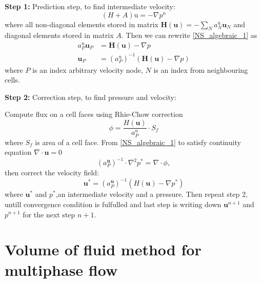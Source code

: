 \textbf{Step 1:} Prediction step, to find intermediate velocity:
\begin{equation}\label{NS_algebraic_1}
    (H+A)\mathrm{u} = -\nabla p^n
\end{equation}
where all non-diagonal elements stored in matrix $\mathbf{H}(\mathbf{u})= -\sum_{N} a_{N}^{\mathrm{u}} \mathbf{u}_{N}$ and diagonal elements stored in matrix $A$. Then we can rewrite \ref{NS_algebraic_1} as
\begin{equation}\label{NS_algebraic_2_}
    \begin{aligned}
a_{P}^{\mathrm{u}} \mathbf{u}_{P} &= \mathbf{H}(\mathbf{u})-\nabla p \\
\mathbf{u}_{P} &= \left(a_{P}^{\mathrm{u}}\right)^{-1}(\mathbf{H}(\mathbf{u})-\nabla p)
\end{aligned}
\end{equation}
where $P$ is an index arbitrary velocity node, $N$ is an index from neighbouring cells.

\textbf{Step 2:} Correction step, to find pressure and velocity:

Compute flux on a cell faces using Rhie-Chow \cite{rhie} correction
\begin{equation}
    \phi = \frac{H(\mathbf{u})}{a^u_P}\cdot S_f
\end{equation}
where $S_f$ is area of a cell face. From \ref{NS_algebraic_1} to satisfy continuity equation $\nabla\cdot \mathbf{u} = 0$
\begin{equation}
    (a_{P}^{\mathbf{u}})^{-1} \cdot \nabla^2 p^* = \nabla \cdot \phi,
\end{equation}
then correct the velocity field:
\begin{equation}
    \mathbf{u}^{*} = (a_{P}^{\mathbf{u}})^{-1}(H(\mathbf{u}) - \nabla p^*)
\end{equation}
where $\mathbf{u}^*$ and $p^*$,an intermediate velocity and a pressure. Then repeat step 2, untill convergence condition is fulfulled and last step is writing down $\mathbf{u}^{n+1}$ and $p^{n+1}$ for the next step $n + 1$.

\section{Volume of fluid method for multiphase flow}

